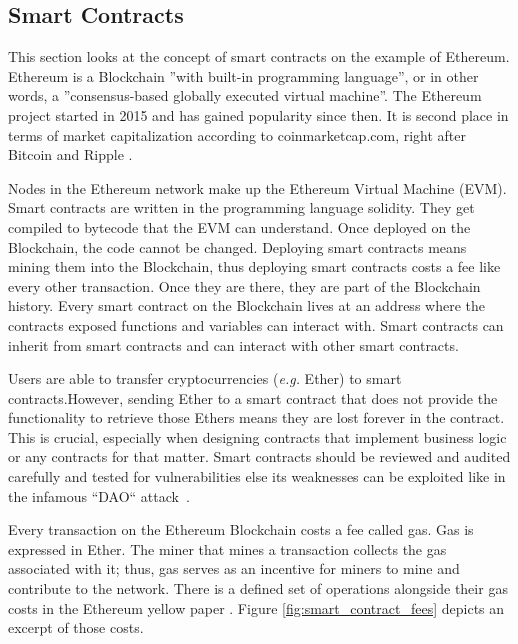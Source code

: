 \subsection{Smart Contracts}
\label{subsec:02_smart_contracts}

This section looks at the concept of smart contracts on the example of Ethereum.
Ethereum is a Blockchain ''with built-in programming language'', or in other words, a ''consensus-based globally executed virtual machine''.
The Ethereum project started in 2015 and has gained popularity since then. It is second place in terms of market capitalization according to coinmarketcap.com, right after Bitcoin and Ripple \cite{coinmarketcap}.

Nodes in the Ethereum network make up the Ethereum Virtual Machine (EVM). Smart contracts are written in the programming language solidity. They get compiled to bytecode that the EVM can understand.
Once deployed on the Blockchain, the code cannot be changed. Deploying smart contracts means mining them into the Blockchain, thus deploying smart contracts costs a fee like every other transaction. Once they are there, they are part of the Blockchain history. Every smart contract on the Blockchain lives at an address where the contracts exposed functions and variables can interact with. Smart contracts can inherit from smart contracts and can interact with other smart contracts.

Users are able to transfer cryptocurrencies (\textit{e.g.} Ether) to smart contracts.However, sending Ether to a smart contract that does not provide the functionality to retrieve those Ethers means they are lost forever in the contract. This is crucial, especially when designing contracts that implement business logic or any contracts for that matter. Smart contracts should be reviewed and audited carefully and tested for vulnerabilities else its weaknesses can be exploited like in the infamous ``DAO`` attack~\cite{DoaAttack}.

Every transaction on the Ethereum Blockchain costs a fee called gas. Gas is expressed in Ether. The miner that mines a transaction collects the gas associated with it; thus, gas serves as an incentive for miners to mine and contribute to the network. There is a defined set of operations alongside their gas costs in the Ethereum yellow paper \cite{ethereumyellowpaer}.
Figure \ref{fig:smart_contract_fees} depicts an excerpt of those costs.

